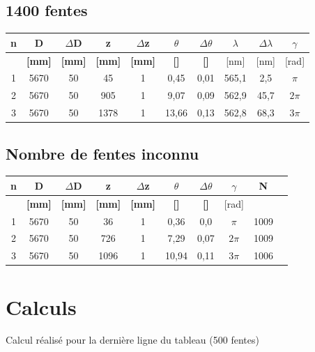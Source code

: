\documentclass[11pt,a4paper]{report}
\begin{document}
	\subsection{1400 fentes}
	\begin{center}	
	\begin{tabular}{|c|c|c|c|c|c|c|c|c|c|}
		\hline
		\bf n & \bf D & \bf $\Delta$D & \bf z & \bf $\Delta$z & \bf $\theta$ & \bf $\Delta \theta$ & $\lambda$& $\Delta \lambda$&\bf $\gamma$ \\
		\hline
		 & \bf [mm] & \bf [mm] & \bf [mm] & \bf [mm] & \bf [\degre]  & \bf [\degre]  &  [nm] & [nm] & [rad]\\
		\hline
		1 & 5670 & 50 & 45 &   1&0,45&0,01&565,1&2,5&$\pi$\\
		2 & 5670 & 50 & 905 &  1&9,07&0,09&562,9&45,7&$2\pi$\\
		3 & 5670 & 50 & 1378 &  1&13,66&0,13&562,8&68,3&$3\pi$\\
		\hline
	\end{tabular}
	\end{center}
	\subsection{Nombre de fentes inconnu}
	\begin{center}	
	\begin{tabular}{|c|c|c|c|c|c|c|c|c|c|}
		\hline
		\bf n & \bf D & \bf $\Delta$D & \bf z & \bf $\Delta$z & \bf $\theta$ & \bf $\Delta \theta$ &\bf $\gamma$ & N\\
		\hline
		 & \bf [mm] & \bf [mm] & \bf [mm] & \bf [mm] & \bf [\degre]  & \bf [\degre]  & [rad] &\\
		\hline
		1 & 5670 & 50 & 36 &   1&0,36& 0,0 &$\pi$&1009\\
		2 & 5670 & 50 & 726 &  1&7,29& 0,07&$2\pi$&1009\\
		3 & 5670 & 50 & 1096 &  1&10,94&0,11 &$3\pi$&1006\\
		\hline
	\end{tabular}
	\end{center}
	\section{Calculs}
	Calcul réalisé pour la dernière ligne du tableau (500 fentes) 
\end{document}
